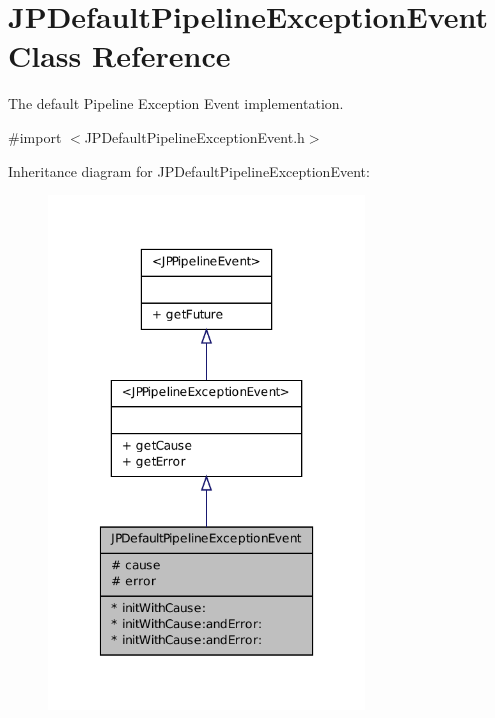 \hypertarget{a00013}{
\section{JPDefaultPipelineExceptionEvent Class Reference}
\label{a00013}
}


The default Pipeline Exception Event implementation.  




{\ttfamily \#import $<$JPDefaultPipelineExceptionEvent.h$>$}



Inheritance diagram for JPDefaultPipelineExceptionEvent:\nopagebreak
\begin{figure}[H]
\begin{center}
\leavevmode
\includegraphics[width=238pt]{a00100}
\end{center}
\end{figure}


